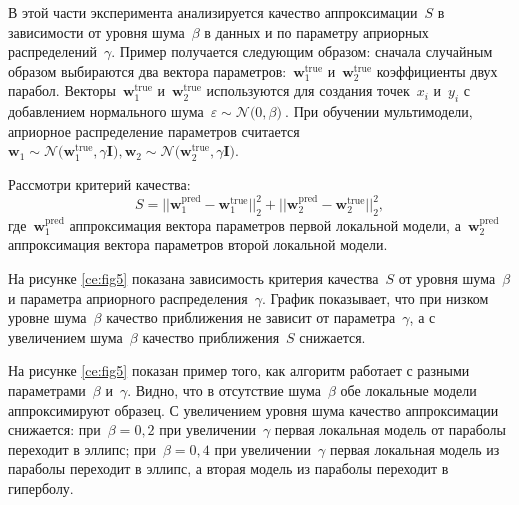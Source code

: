 В этой части эксперимента анализируется качество аппроксимации~$S$ в зависимости от уровня шума~$\beta$ в данных и по параметру априорных распределений~$\gamma$. Пример получается следующим образом: сначала случайным образом выбираются два вектора параметров:~$\mathbf{w}^\text{true}_{1}$ и~$\mathbf{w}^\text{true}_{2}$ коэффициенты двух парабол. Векторы~$\mathbf{w}^\text{true}_{1}$ и~$\mathbf{w}^\text{true}_{2}$ используются для создания точек~$x_i$ и~$y_i$ с добавлением нормального шума~$\varepsilon\sim\mathcal{N}\bigr(0, \beta\bigr)~$. При обучении мультимодели, априорное распределение параметров считается~$\mathbf{w}_1\sim\mathcal{N}\bigr(\mathbf{w}^\text{true}_{1}, \gamma\mathbf{I}\bigr), \mathbf{w}_2\sim\mathcal{N}\bigr(\mathbf{w}^\text{true}_{2},\gamma\mathbf{I}\bigr)$.

Рассмотри критерий качества:
\[
S = ||\mathbf{w}^\text{pred}_{1} - \mathbf{w}^\text{true}_{1}||^{2}_{2} + ||\mathbf{w}^\text{pred}_{2} - \mathbf{w}^\text{true}_{2}||^{2}_{2},
\]
где~$\mathbf{w}^\text{pred}_{1}$ аппроксимация вектора параметров первой локальной модели, а~$\mathbf{w}^\text{pred}_{2}~$ аппроксимация вектора параметров второй локальной модели.

На рисунке \ref{ce:fig5} показана зависимость критерия качества~$S$ от уровня шума~$\beta$ и параметра априорного распределения~$\gamma$. График показывает, что при низком уровне шума~$\beta$ качество приближения не зависит от параметра~$\gamma$, а с увеличением шума~$\beta$ качество приближения~$S$ снижается.

На рисунке \ref{ce:fig5} показан пример того, как алгоритм работает с разными параметрами~$\beta$ и~$\gamma$. Видно, что в отсутствие шума~$\beta$ обе локальные модели аппроксимируют образец. С увеличением уровня шума качество аппроксимации снижается: при~$\beta = 0{,}2$ при увеличении~$\gamma$ первая локальная модель от параболы переходит в эллипс; при~$\beta = 0{,}4$ при увеличении~$\gamma$ первая локальная модель из параболы переходит в эллипс, а вторая модель из параболы переходит в гиперболу.

